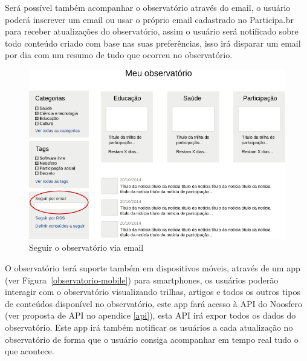 \documentclass[12pt]{article}
\begin{document}
Será possível também acompanhar o observatório através do email, o usuário
poderá inscrever um email ou usar o próprio email cadastrado no Participa.br
para receber atualizações do observatório, assim o usuário será notificado
sobre todo conteúdo criado com base nas suas preferências, isso irá disparar
um email por dia com um resumo de tudo que ocorreu no observatório.

\begin{figure}[h]
\center
\includegraphics[scale=0.60]{observatorio-email.png}
\caption{Seguir o observatório via email}
\label{observatorio-email}
\end{figure}

O observatório terá suporte também em dispositivos móveis, através de um app
(ver Figura~\ref{observatorio-mobile}) para smartphones, os usuários poderão
interagir com o observatório visualizando trilhas, artigos e todos os outros
tipos de conteúdos disponível no observatório, este app fará acesso à API do
Noosfero (ver proposta de API no apendice \ref{api}), esta API irá expor todos
os dados do observatório.  Este app irá também notificar os usuários a cada
atualização no observatório de forma que o usuário consiga acompanhar em tempo
real tudo o que acontece.
\end{document}
